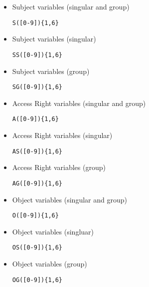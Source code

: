 \documentclass[10pt, twocolumn]{article}
\begin{document}
\begin{itemize}
              \begin{itemize}
                \item
                  Subject variables (singular and group)

                  \begin{verbatim}S([0-9]){1,6}\end{verbatim}
                \item
                  Subject variables (singular)

                  \begin{verbatim}SS([0-9]){1,6}\end{verbatim}
                \item
                  Subject variables (group)

                  \begin{verbatim}SG([0-9]){1,6}\end{verbatim}
                \item
                  Access Right variables (singular and group)

                  \begin{verbatim}A([0-9]){1,6}\end{verbatim}
                \item
                  Access Right variables (singular)

                  \begin{verbatim}AS([0-9]){1,6}\end{verbatim}
                \item
                  Access Right variables (group)

                  \begin{verbatim}AG([0-9]){1,6}\end{verbatim}
                \item
                  Object variables (singular and group)

                  \begin{verbatim}O([0-9]){1,6}\end{verbatim}
                \item
                  Object variables (singluar)

                  \begin{verbatim}OS([0-9]){1,6}\end{verbatim}
                \item
                  Object variables (group)

                  \begin{verbatim}OG([0-9]){1,6}\end{verbatim}
              \end{itemize}
          \end{itemize}
\end{document}
